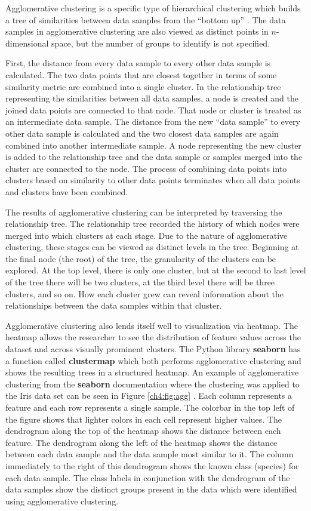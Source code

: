 Agglomerative clustering is a specific type of hierarchical clustering which builds a tree of similarities between data samples from the ``bottom up'' \cite{Ward1963}. The data samples in agglomerative clustering are also viewed as distinct points in $n$-dimensional space, but the number of groups to identify is not specified. 

First, the distance from every data sample to every other data sample is calculated. The two data points that are closest together in terms of some similarity metric are combined into a single cluster. In the relationship tree representing the similarities between all data samples, a node is created and the joined data points are connected to that node. That node or cluster is treated as an intermediate data sample. The distance from the new ``data sample'' to every other data sample is calculated and the two closest data samples are again combined into another intermediate sample. A node representing the new cluster is added to the relationship tree and the data sample or samples merged into the cluster are connected to the node. The process of combining data points into clusters based on similarity to other data points terminates when all data points and clusters have been combined. 

The results of agglomerative clustering can be interpreted by traversing the relationship tree. The relationship tree recorded the history of which nodes were merged into which clusters at each stage. Due to the nature of agglomerative clustering, these stages can be viewed as distinct levels in the tree. Beginning at the final node (the root) of the tree, the granularity of the clusters can be explored. At the top level, there is only one cluster, but at the second to last level of the tree there will be two clusters, at the third level there will be three clusters, and so on. How each cluster grew can reveal information about the relationships between the data samples within that cluster.

Agglomerative clustering also lends itself well to visualization via heatmap. The heatmap allows the researcher to see the distribution of feature values across the dataset and across visually prominent clusters. The Python library \textbf{seaborn} has a function called \textbf{clustermap} which both performs agglomerative clustering and shows the resulting trees in a structured heatmap. An example of agglomerative clustering from the \textbf{seaborn} documentation where the clustering was applied to the Iris data set can be seen in  Figure \ref{ch4:fig:agg} \cite{Waskom2018}. Each column represents a feature and each row represents a single sample. The colorbar in the top left of the figure shows that lighter colors in each cell represent higher values. The dendrogram along the top of the heatmap shows the distance between each feature. The dendrogram along the left of the heatmap shows the distance between each data sample and the data sample most similar to it. The column immediately to the right of this dendrogram shows the known class (species) for each data sample. The class labels in conjunction with the dendrogram of the data samples show the distinct groups present in the data which were identified using agglomerative clustering. 

